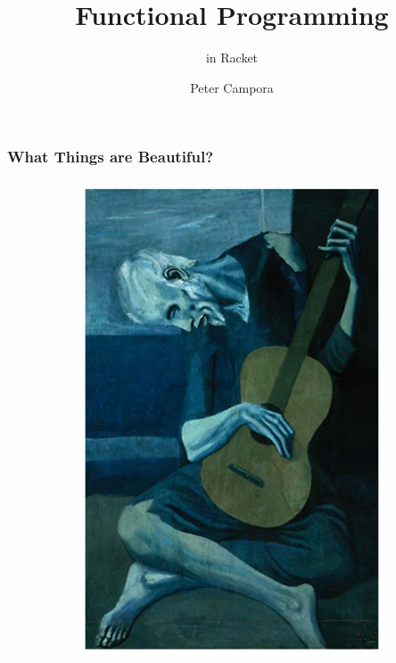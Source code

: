 \documentclass{beamer}
\title{Functional Programming}
\subtitle{in Racket}
\author{Peter Campora}
\institute{ULL}
\begin{document}
\begin{frame}
\titlepage
\end{frame}

 
\begin{frame}
  \frametitle{What Things are Beautiful?}
  \begin{figure}[t]
    \begin{subfigure}[b]{.3\textwidth}
      \includegraphics[width=.9\textwidth]{images/old-guitarist.jpg}       
    \end{subfigure}
    \pause

\end{figure}
\end{frame}
\end{document}

